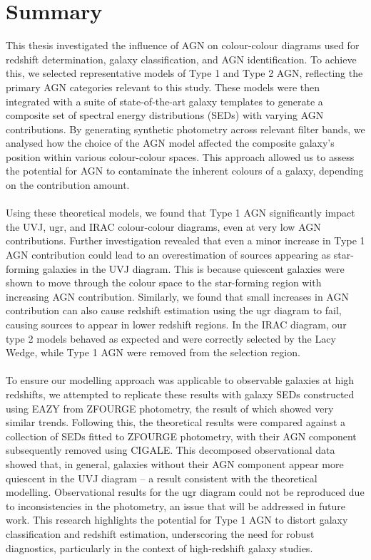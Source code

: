 \section{Summary}
This thesis investigated the influence of AGN on colour-colour diagrams used for redshift determination, galaxy classification, and AGN identification. To achieve this, we selected representative models of Type 1 and Type 2 AGN, reflecting the primary AGN categories relevant to this study. These models were then integrated with a suite of state-of-the-art galaxy templates to generate a composite set of spectral energy distributions (SEDs) with varying AGN contributions. By generating synthetic photometry across relevant filter bands, we analysed how the choice of the AGN model affected the composite galaxy's position within various colour-colour spaces. This approach allowed us to assess the potential for AGN to contaminate the inherent colours of a galaxy, depending on the contribution amount. \\\\ 
Using these theoretical models, we found that Type 1 AGN significantly impact the UVJ, ugr, and IRAC colour-colour diagrams, even at very low AGN contributions. Further investigation revealed that even a minor increase in Type 1 AGN contribution could lead to an overestimation of sources appearing as star-forming galaxies in the UVJ diagram. This is because quiescent galaxies were shown to move through the colour space to the star-forming region with increasing AGN contribution. Similarly, we found that small increases in AGN contribution can also cause redshift estimation using the ugr diagram to fail, causing sources to appear in lower redshift regions.  In the IRAC diagram, our type 2 models behaved as expected and were correctly selected by the Lacy Wedge, while Type 1 AGN were removed from the selection region. \\\\
To ensure our modelling approach was applicable to observable galaxies at high redshifts, we attempted to replicate these results with galaxy SEDs constructed using EAZY from ZFOURGE photometry, the result of which showed very similar trends. Following this, the theoretical results were compared against a collection of SEDs fitted to ZFOURGE photometry, with their AGN component subsequently removed using CIGALE. This decomposed observational data showed that, in general, galaxies without their AGN component appear more quiescent in the UVJ diagram – a result consistent with the theoretical modelling. Observational results for the ugr diagram could not be reproduced due to inconsistencies in the photometry, an issue that will be addressed in future work. This research highlights the potential for Type 1 AGN to distort galaxy classification and redshift estimation, underscoring the need for robust diagnostics, particularly in the context of high-redshift galaxy studies.
\newpage
